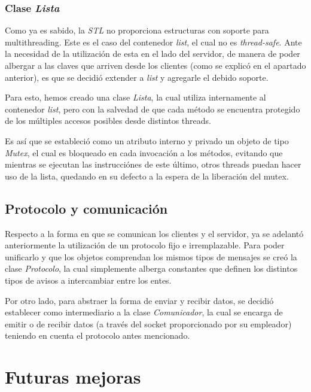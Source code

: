 \documentclass{article}
\begin{document}
\subsubsection{Clase \textit{Lista}}
	
	Como ya es sabido, la \textit{STL} \cite{STL} no proporciona estructuras con soporte para multithreading. Este es el caso del contenedor \textit{list}, el cual no es \textit{thread-safe}. Ante la necesidad de la utilización de esta en el lado del servidor, de manera de poder albergar a las claves que arriven desde los clientes (como se explicó en el apartado anterior), es que se decidió extender a \textit{list} y agregarle el debido soporte.
	\par
	Para esto, hemos creado una clase \textit{Lista}, la cual utiliza internamente al contenedor \textit{list}, pero con la salvedad de que cada método se encuentra protegido de los múltiples accesos posibles desde distintos threads. 
	\par
	Es así que se estableció como un atributo interno y privado un objeto de tipo \textit{Mutex}, el cual es bloqueado en cada invocación a los métodos, evitando que mientras se ejecutan las instrucciónes de este último, otros threads puedan hacer uso de la lista, quedando en su defecto a la espera de la liberación del mutex.
	\bigskip\medskip




\subsection{Protocolo y comunicación}

	Respecto a la forma en que se comunican los clientes y el servidor, ya se adelantó anteriormente la utilización de un protocolo fijo e irremplazable. Para poder unificarlo y que los objetos comprendan los mismos tipos de mensajes se creó la clase \textit{Protocolo}, la cual simplemente alberga constantes que definen los distintos tipos de avisos a intercambiar entre los entes.
	\par
	Por otro lado, para abstraer la forma de enviar y recibir datos, se decidió establecer como intermediario a la clase \textit{Comunicador}, la cual se encarga de emitir o de recibir datos (a través del socket proporcionado por su empleador) teniendo en cuenta el protocolo antes mencionado.
	\bigskip\bigskip




\section{Futuras mejoras}
\end{document}
